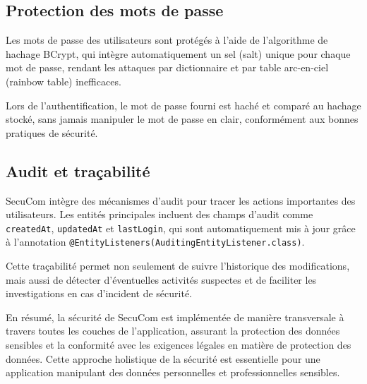 \subsection{Protection des mots de passe}

Les mots de passe des utilisateurs sont protégés à l'aide de l'algorithme de hachage BCrypt, qui intègre automatiquement un sel (salt) unique pour chaque mot de passe, rendant les attaques par dictionnaire et par table arc-en-ciel (rainbow table) inefficaces.

\vspace{0.5cm}

\begin{note}
Lors de l'authentification, le mot de passe fourni est haché et comparé au hachage stocké, sans jamais manipuler le mot de passe en clair, conformément aux bonnes pratiques de sécurité.
\end{note}

\subsection{Audit et traçabilité}

SecuCom intègre des mécanismes d'audit pour tracer les actions importantes des utilisateurs. Les entités principales incluent des champs d'audit comme \texttt{createdAt}, \texttt{updatedAt} et \texttt{lastLogin}, qui sont automatiquement mis à jour grâce à l'annotation \texttt{@EntityListeners(AuditingEntityListener.class)}.

\vspace{0.5cm}

Cette traçabilité permet non seulement de suivre l'historique des modifications, mais aussi de détecter d'éventuelles activités suspectes et de faciliter les investigations en cas d'incident de sécurité.

\vspace{1cm}

\begin{tcolorbox}[
  title={\textbf{Sécurité transversale}},
  colback=blue!5!white,
  colframe=primarycolor,
  fonttitle=\bfseries,
  boxrule=0.5mm,
  arc=2mm,
  left=6mm,
  right=6mm,
  top=6mm,
  bottom=6mm
]
En résumé, la sécurité de SecuCom est implémentée de manière transversale à travers toutes les couches de l'application, assurant la protection des données sensibles et la conformité avec les exigences légales en matière de protection des données. Cette approche holistique de la sécurité est essentielle pour une application manipulant des données personnelles et professionnelles sensibles.
\end{tcolorbox}
